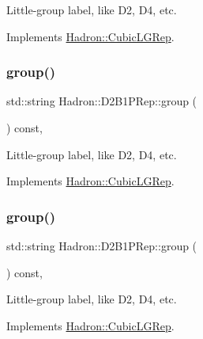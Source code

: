 Little-\/group label, like D2, D4, etc. 

Implements \mbox{\hyperlink{structHadron_1_1CubicLGRep_a9bdb14b519a611d21379ed96a3a9eb41}{Hadron\+::\+Cubic\+L\+G\+Rep}}.

\mbox{\label{structHadron_1_1D2B1PRep_ac5e1e2dc68a975d7263f783bbc7f4658}} 
\subsubsection{\texorpdfstring{group()}{group()}\hspace{0.1cm}{\footnotesize\ttfamily [2/3]}}
{\footnotesize\ttfamily std\+::string Hadron\+::\+D2\+B1\+P\+Rep\+::group (\begin{DoxyParamCaption}{ }\end{DoxyParamCaption}) const\hspace{0.3cm}{\ttfamily [inline]}, {\ttfamily [virtual]}}

Little-\/group label, like D2, D4, etc. 

Implements \mbox{\hyperlink{structHadron_1_1CubicLGRep_a9bdb14b519a611d21379ed96a3a9eb41}{Hadron\+::\+Cubic\+L\+G\+Rep}}.

\mbox{\label{structHadron_1_1D2B1PRep_ac5e1e2dc68a975d7263f783bbc7f4658}} 
\subsubsection{\texorpdfstring{group()}{group()}\hspace{0.1cm}{\footnotesize\ttfamily [3/3]}}
{\footnotesize\ttfamily std\+::string Hadron\+::\+D2\+B1\+P\+Rep\+::group (\begin{DoxyParamCaption}{ }\end{DoxyParamCaption}) const\hspace{0.3cm}{\ttfamily [inline]}, {\ttfamily [virtual]}}

Little-\/group label, like D2, D4, etc. 

Implements \mbox{\hyperlink{structHadron_1_1CubicLGRep_a9bdb14b519a611d21379ed96a3a9eb41}{Hadron\+::\+Cubic\+L\+G\+Rep}}.

\mbox{\label{structHadron_1_1D2B1PRep_ab8cddfe5f5e849b0b3d804576558b445}} 
